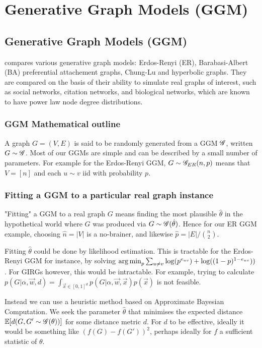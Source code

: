\chapter{Generative Graph Models (GGM)}

\section{Generative Graph Models (GGM)}
\cite{blasius2018towards} compares various generative graph models: Erdos-Renyi (ER), Barabasi-Albert (BA) preferential attachement graphs, Chung-Lu and hyperbolic graphs.
They are compared on the basis of their ability to simulate real graphs of interest, such as social networks, citation networks, and biological networks, which are known to have power law node degree distributions.

\subsection{GGM Mathematical outline}
A graph $G = (V,E)$ is said to be randomly generated from a GGM $\mathscr{G}$, written $G \sim \mathscr{G}$. Most of our GGMs are simple and can be described by a small number of parameters. For example for the Erdos-Renyi GGM, $G \sim \mathscr{G}_{ER}(n, p)$ means that $V=[n]$ and each $u \sim v$ iid with probability $p$.

\subsection{Fitting a GGM to a particular real graph instance}
"Fitting" a GGM to a real graph $G$ means finding the most plausible $\hat{\theta}$ in the hypothetical world where $G$ was produced via $G \sim \mathscr{G}(\hat{\theta})$. Hence for our ER GGM example, choosing $\hat{n} = |V|$ is a no-brainer, and likewise $\hat{p} = |E| / \binom{n}{2}$.

Fitting $\hat{\theta}$ could be done by likelihood estimation. This is tractable for the Erdos-Renyi GGM for instance, by solving $\operatorname*{arg\,min}_p \sum_{u \neq v} \log(p^{e_{uv}}) + \log((1-p)^{1 - e_{uv}}))$. For GIRGs however, this would be intractable. For example, trying to calculate $p(G | \alpha, \vec{w}, d) = \int_{\vec{x} \in [0,1]^d} p(G | \alpha, \vec{w}, \vec{x}) p(\vec{x})$ is not feasible.

Instead we can use a heuristic method based on Approximate Bayesian Computation. We seek the parameter $\hat{\theta}$ that minimises the expected distance $ \mathbb{E}[d(G, G' \sim \mathscr{G}(\theta))]$ for some distance metric $d$. For $d$ to be effective, ideally it would be something like $(f(G) - f(G'))^2$, perhaps ideally for $f$ a sufficient statistic of $\theta$.

